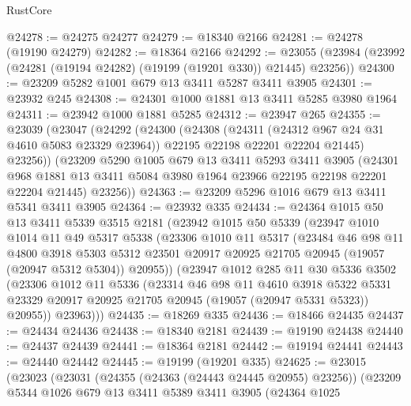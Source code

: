 \begin{lexlean}{RustCore}
\begin{coremodule}
@24278 := @24275 @24277
@24279 := @18340 @2166
@24281 := @24278 (@19190 @24279)
@24282 := @18364 @2166
@24292 := @23055 (@23984 (@23992 (@24281 (@19194 @24282) (@19199 (@19201 @330)) @21445) @23256))
@24300 := @23209 @5282 @1001 @679 @13 @3411 @5287 @3411 @3905
@24301 := @23932 @245
@24308 := @24301 @1000 @1881 @13 @3411 @5285 @3980 @1964
@24311 := @23942 @1000 @1881 @5285
@24312 := @23947 @265
@24355 := @23039
    (@23047
      (@24292
        (@24300
          (@24308
            (@24311 (@24312 @967 @24 @31 @4610 @5083 @23329 @23964))
            @22195
            @22198
            @22201
            @22204
            @21445)
          @23256))
      (@23209
        @5290
        @1005
        @679
        @13
        @3411
        @5293
        @3411
        @3905
        (@24301 @968 @1881 @13 @3411 @5084 @3980 @1964 @23966 @22195 @22198 @22201 @22204 @21445)
        @23256))
@24363 := @23209 @5296 @1016 @679 @13 @3411 @5341 @3411 @3905
@24364 := @23932 @335
@24434 := @24364
    @1015
    @50
    @13
    @3411
    @5339
    @3515
    @2181
    (@23942
      @1015
      @50
      @5339
      (@23947
        @1010
        @1014
        @11
        @49
        @5317
        @5338
        (@23306
          @1010
          @11
          @5317
          (@23484
            @46
            @98
            @11
            @4800
            @3918
            @5303
            @5312
            @23501
            @20917
            @20925
            @21705
            @20945
            (@19057 (@20947 @5312 @5304))
            @20955))
        (@23947
          @1012
          @285
          @11
          @30
          @5336
          @3502
          (@23306
            @1012
            @11
            @5336
            (@23314
              @46
              @98
              @11
              @4610
              @3918
              @5322
              @5331
              @23329
              @20917
              @20925
              @21705
              @20945
              (@19057 (@20947 @5331 @5323))
              @20955))
          @23963)))
@24435 := @18269 @335
@24436 := @18466 @24435
@24437 := @24434 @24436
@24438 := @18340 @2181
@24439 := @19190 @24438
@24440 := @24437 @24439
@24441 := @18364 @2181
@24442 := @19194 @24441
@24443 := @24440 @24442
@24445 := @19199 (@19201 @335)
@24625 := @23015
    (@23023
      (@23031
        (@24355 (@24363 (@24443 @24445 @20955) @23256))
        (@23209
          @5344
          @1026
          @679
          @13
          @3411
          @5389
          @3411
          @3905
          (@24364
            @1025

\end{coremodule}
\end{lexlean}
